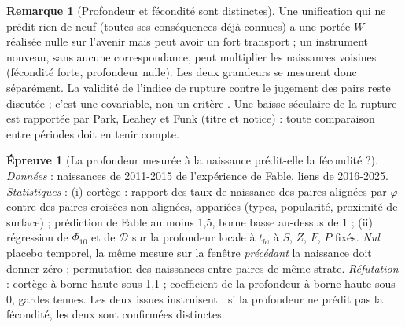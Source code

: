\documentclass[11pt,a4paper]{article}
\theoremstyle{definition}
\newtheorem{remarque}[definition]{Remarque}
\newtheorem{test}[definition]{Épreuve}
\theoremstyle{plain}
\begin{document}
\begin{remarque}[Profondeur et fécondité sont distinctes]
Une unification qui ne prédit rien de neuf (toutes ses conséquences déjà connues) a une portée
$W$ réalisée nulle sur l'avenir mais peut avoir un fort transport ; un instrument nouveau, sans
aucune correspondance, peut multiplier les naissances voisines (fécondité forte, profondeur nulle).
Les deux grandeurs se mesurent donc séparément. La validité de l'indice de rupture contre le
jugement des pairs reste discutée \cite{bornmann2020,leibel2024} ; c'est une covariable, non un
critère \cite[section~2]{q2}. Une baisse séculaire de la rupture est rapportée par Park, Leahey et
Funk \cite{park2023} (titre et notice) : toute comparaison entre périodes doit en tenir compte.
\end{remarque}

\begin{test}[La profondeur mesurée à la naissance prédit-elle la fécondité ?]
\label{test:fecondite}
\emph{Données} : naissances de 2011-2015 de l'expérience de Fable, liens de 2016-2025.
\emph{Statistiques} : (i) cortège : rapport des taux de naissance des paires alignées par $\varphi$
contre des paires croisées non alignées, appariées (types, popularité, proximité de surface) ;
prédiction de Fable au moins 1,5, borne basse au-dessus de 1 \cite[partie~7]{fable} ; (ii) régression
de $\Phi_{10}$ et de $\mathcal{D}$ sur la profondeur locale à $t_b$, à $S$, $Z$, $F$, $P$ fixés.
\emph{Nul} : placebo temporel, la même mesure sur la fenêtre \emph{précédant} la naissance doit
donner zéro ; permutation des naissances entre paires de même strate. \emph{Réfutation} : cortège à
borne haute sous 1,1 ; coefficient de la profondeur à borne haute sous 0, gardes tenues. Les deux
issues instruisent : si la profondeur ne prédit pas la fécondité, les deux sont confirmées
distinctes.
\end{test}
\end{document}
